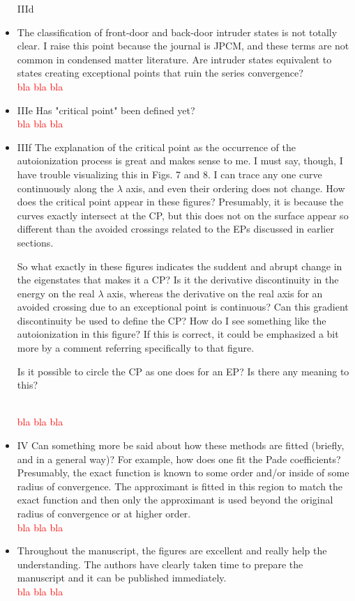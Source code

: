\documentclass[10pt]{letter}
\newcommand{\alert}[1]{\textcolor{red}{#1}}
\begin{document}
\begin{letter}
\begin{itemize}
IIId
\item 
{The classification of front-door and back-door intruder states is not totally clear. I raise this point because the journal is JPCM, and these terms are not common in condensed matter literature. Are intruder states equivalent to states creating exceptional points that ruin the series convergence?}
	\\
	\alert{bla bla bla}


\item 
{IIIe
Has "critical point" been defined yet?}
	\\
	\alert{bla bla bla}


\item 
{IIIf
The explanation of the critical point as the occurrence of the autoionization process is great and makes sense to me. I must say, though, I have trouble visualizing this in Figs. 7 and 8. I can trace any one curve continuously along the $\lambda$ axis, and even their ordering does not change. How does the critical point appear in these figures? Presumably, it is because the curves exactly intersect at the CP, but this does not on the surface appear so different than the avoided crossings related to the EPs discussed in earlier sections.

So what exactly in these figures indicates the suddent and abrupt change in the eigenstates that makes it a CP? Is it the derivative discontinuity in the energy on the real $\lambda$ axis, whereas the derivative on the real axis for an avoided crossing due to an exceptional point is continuous? Can this gradient discontinuity be used to define the CP? How do I see something like the autoionization in this figure? If this is correct, it could be emphasized a bit more by a comment referring specifically to that figure.

Is it possible to circle the CP as one does for an EP? Is there any meaning to this?}
	\\
	\alert{bla bla bla}


\item 
{IV
Can something more be said about how these methods are fitted (briefly, and in a general way)? For example, how does one fit the Pade coefficients? Presumably, the exact function is known to some order and/or inside of some radius of convergence. The approximant is fitted in this region to match the exact function and then only the approximant is used beyond the original radius of convergence or at higher order.}
	\\
	\alert{bla bla bla}


\item 
{Throughout the manuscript, the figures are excellent and really help the understanding. The authors have clearly taken time to prepare the manuscript and it can be published immediately.}
	\\
	\alert{bla bla bla}
	
\end{itemize}
 
\end{letter}
\end{document}
